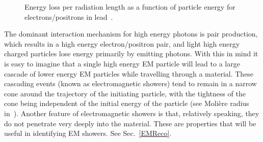 \begin{figure}[!ht]
  \begin{center}
    \scalebox{0.8}{
      \texttt{[image: plots/Chap2/elossfrac\_06.eps]}
    }
  \end{center}
  \caption[Stopping power for positive muons in copper.]
  {\small Energy loss per radiation length as a function of particle energy for electrons/positrons in lead~\cite{PDG}. } 
  \label{StoppingElectron}
\end{figure}

The dominant interaction mechanism for high energy photons is pair production, which results in a high energy electron/positron pair, and light high energy charged particles lose energy primarily by emitting photons.  
With this in mind it is easy to imagine that a single high energy EM particle will lead to a large cascade of lower energy EM particles while travelling through a material.  
These cascading events (known as electromagnetic showers) tend to remain in a narrow cone around the trajectory of the initiating particle, with the tightness of the cone being independent of the initial energy of the particle (see Moli{\`e}re radius in~\cite{grupen2008particle}).  
Another feature of electromagnetic showers is that, relatively speaking, they do not penetrate very deeply into the material.   
These are properties that will be useful in identifying EM showers.  
See Sec.~\ref{EMReco}. 


